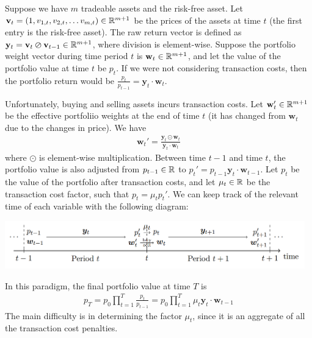 Suppose we have $m$ tradeable assets and the risk-free asset. Let $\mathbf v_t = (1, v_{1,t}, v_{2,t}, \ldots v_{m,t}) \in \mathbb{R}^{m+1}$ be the
prices of the assets at time $t$ (the first entry is the risk-free asset). The raw return vector is defined as
$\mathbf y_t = \mathbf v_t \varoslash \mathbf v_{t-1} \in \mathbb{R}^{m+1}$, where division is element-wise. Suppose the portfolio
weight vector during time period $t$ is $\mathbf w_t \in \mathbb{R}^{m+1}$, and let the value of the portfolio value at time $t$ be $p_t$.
If we were not considering transaction costs, then the portfolio return would be $\frac{p_t}{p_{t-1}} = \mathbf y_t \cdot \mathbf w_t$.

Unfortunately, buying and selling assets incurs transaction costs. Let $\mathbf w_t' \in \mathbb{R}^{m+1}$ be the effective portfoliio weights
at the end of time $t$ (it has changed from $\mathbf w_t$ due to the changes in price). We have
\begin{align*}
  \mathbf w_t' = \frac{\mathbf y_t \odot \mathbf w_t}{\mathbf y_t \cdot \mathbf w_t}
\end{align*}
where $\odot$ is element-wise multiplication. Between time $t-1$ and time $t$, the portfolio value is also
adjusted from $p_{t-1} \in \mathbb{R}$ to $p_t' = p_{t-1} \mathbf y_t \cdot \mathbf w_{t-1}$. Let $p_t$ be the value of the portfolio
after transaction costs, and let $\mu_t \in \mathbb{R}$ be the transaction cost factor, such that $p_t = \mu_t p_t'$.
We can keep track of the relevant time of each variable with the following diagram:

\begin{center}
  \includegraphics[width=13cm]{transaction_cost_time_updates.png}
\end{center}

In this paradigm, the final portfolio value at time $T$ is
\begin{align*}
  p_T = p_0 \prod_{t=1}^T \frac{p_t}{p_{t-1}} = p_0 \prod_{t=1}^T \mu_t \mathbf y_t \cdot \mathbf w_{t-1}
\end{align*}
The main difficulty is in determining the factor $\mu_t$, since it is an aggregate of all the transaction cost penalties.

